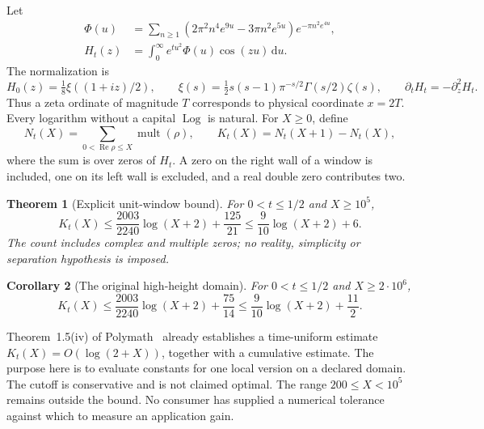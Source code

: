 \documentclass[11pt]{article}
\newtheorem{theorem}{Theorem}[section]
\newtheorem{corollary}[theorem]{Corollary}
\theoremstyle{remark}
\newcommand{\dd}{\,\mathrm d}
\numberwithin{equation}{section}
\begin{document}
Let
\begin{align}
 \Phi(u)&=\sum_{n\ge1}
 (2\pi^2n^4e^{9u}-3\pi n^2e^{5u})e^{-\pi n^2e^{4u}},\label{eq:phi}\\
 H_t(z)&=\int_0^\infty e^{tu^2}\Phi(u)\cos(zu)\dd u.
 \label{eq:heat}
\end{align}
The normalization is
\begin{equation}\label{eq:xi}
 H_0(z)=\tfrac18\xi((1+iz)/2),\qquad
 \xi(s)=\tfrac12s(s-1)\pi^{-s/2}\Gamma(s/2)\zeta(s),\qquad
 \partial_tH_t=-\partial_z^2H_t.
\end{equation}
Thus a zeta ordinate of magnitude $T$ corresponds to physical coordinate
$x=2T$. Every logarithm without a capital $\operatorname{Log}$ is natural.
For $X\ge0$, define
\begin{equation}\label{eq:counts}
 N_t(X)=\sum_{0<\operatorname{Re}\rho\le X}\operatorname{mult}(\rho),
 \qquad K_t(X)=N_t(X+1)-N_t(X),
\end{equation}
where the sum is over zeros of $H_t$. A zero on the right wall of a
window is included, one on its left wall is excluded, and a real double
zero contributes two.

\begin{theorem}[Explicit unit-window bound]\label{thm:count}
For $0<t\le1/2$ and $X\ge10^5$,
\begin{equation}\label{eq:main-count}
 K_t(X)\le\frac{2003}{2240}\log(X+2)+\frac{125}{21}
          \le\frac9{10}\log(X+2)+6.
\end{equation}
The count includes complex and multiple zeros; no reality, simplicity
or separation hypothesis is imposed.
\end{theorem}

\begin{corollary}[The original high-height domain]\label{cor:high-count}
For $0<t\le1/2$ and $X\ge2\cdot10^6$,
\begin{equation}\label{eq:high-count}
 K_t(X)\le\frac{2003}{2240}\log(X+2)+\frac{75}{14}
          \le\frac9{10}\log(X+2)+\frac{11}{2}.
\end{equation}
\end{corollary}

Theorem~1.5(iv) of Polymath~\cite{polymath} already establishes a
time-uniform estimate $K_t(X)=O(\log(2+X))$, together with a cumulative
estimate. The purpose here is to evaluate constants for one local
version on a declared domain. The cutoff is conservative and is not
claimed optimal. The range $200\le X<10^5$ remains outside the bound.
No consumer has supplied a numerical tolerance against which to measure
an application gain.
\end{document}
